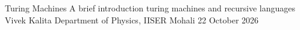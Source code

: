 \documentclass[10pt,a4paper]{article}
\begin{document}
\makemathtitle
    {Turing Machines}
    {A brief introduction turing machines and recursive languages}
    {Vivek Kalita}
    {Department of Physics, IISER Mohali}
    {22 October 2026}

\tableofcontents

 
\end{document}
